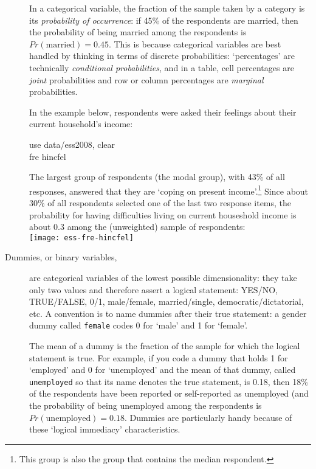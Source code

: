 \begin{description}
	In a categorical variable, the fraction of the sample taken by a category is its \emph{probability of occurrence}: if 45\% of the respondents are married, then the probability of being married among the respondents is $Pr(\mathrm{married}) = 0.45$. This is because categorical variables are best handled by thinking in terms of discrete probabilities: `percentages' are technically \emph{conditional probabilities}, and in a table, cell percentages are \emph{joint} probabilities and row or column percentages are \emph{marginal} probabilities.

	In the example below, \ess respondents were asked their feelings about their current household's income:\\[1em]
	
	\begin{docspec}
		use data/ess2008, clear\\
		fre hincfel
	\end{docspec}
	
	The largest group of respondents (the modal group), with 43\% of all responses, answered that they are `coping on present income'.\footnote{This group is also the group that contains the median respondent.} Since about 30\% of all respondents selected one of the last two response items, the probability for having difficulties living on current houseshold income is about $0.3$ among the (unweighted) sample of respondents:\\[1em]
	
	\texttt{[image: ess-fre-hincfel]}\\[1em]
		
	\item[Dummies, or binary variables,] are categorical variables of the lowest possible dimensionality: they take only two values and therefore assert a logical statement: YES/NO, TRUE/FALSE, 0/1, male/female, married/single, democratic/dictatorial, etc. A convention is to name dummies after their true statement: a gender dummy called \texttt{female} codes 0 for `male' and 1 for `female'.
	
	The mean of a dummy is the fraction of the sample for which the logical statement is true. For example, if you code a dummy that holds 1 for `employed' and 0 for `unemployed' and the mean of that dummy, called \texttt{unemployed} so that its name denotes the true statement, is 0.18, then 18\% of the respondents have been reported or self-reported as unemployed (and the probability of being unemployed among the respondents is $Pr(\mathrm{unemployed}) = 0.18$. Dummies are particularly handy because of these `logical immediacy' characteristics.
	

\end{description}
